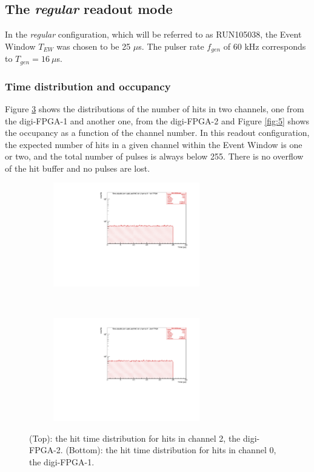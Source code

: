 \subsection{The \textit{regular} readout mode}
In the \textit{regular} configuration, which will be referred 
to as RUN105038, the Event Window $T_{EW}$ was chosen to be 25 $\mu$s. 
The pulser rate $f_{gen}$ of 60 kHz corresponds to $T_{gen}=16 \ \mu$s.

\subsubsection{Time distribution and occupancy}
Figure \ref{fig:4} shows the 
distributions
of the number of hits in two channels, one from the 
digi-FPGA-1 and another one, from the digi-FPGA-2 and Figure 
\ref{fig:5} shows the occupancy as 
a function of the channel number. 
In this readout configuration, the expected number of 
hits in a given channel
within the Event Window is one or two, and the total 
number of pulses is always below 255.
There is no overflow of the hit buffer and no pulses are lost.
\begin{figure}[!h]
  \begin{subfigure}[b]{\textwidth}
      \centering
      \includegraphics[width=0.7\textwidth]{figures/pdf/figure_00001_timedistr_roc_simulation_10538.pdf}
      \label{fig:ttt1}
  \end{subfigure}
\\
  \begin{subfigure}[b]{\textwidth}
      \centering
      \includegraphics[width=0.7\textwidth]{figures/pdf/figure_00012_timedistr_roc_simulation_ch2_105038.pdf}
      \label{fig:ttt2}
  \end{subfigure}
     \caption[The hit time distribution.]{(Top): the hit time distribution for hits in channel 2, the digi-FPGA-2. 
     (Bottom): the hit time distribution for hits in channel 0, the digi-FPGA-1.}
     \label{fig:4}
\end{figure}

